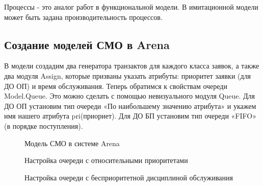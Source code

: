 \documentclass[a4paper,14pt]{report} %
\begin{document}
Процессы - это аналог работ в функциональной модели. В имита­ционной модели может быть задана производительность процессов. 

\subsection{Создание моделей СМО в Arena}
В модели создадим два генератора транзактов для каждого класса заявок, а также два модуля Assign, которые призваны указать атрибуты: приоритет заявки (для ДО ОП) и время обслуживания. Теперь обратимся к свойствам очереди Model.Queue. Это можно сделать с помощью невизуального модуля Queue. Для ДО ОП установим тип очереди «По наибольшему значению атрибута» и укажем имя нашего атрибута pri(приориет). Для ДО БП  установим тип очереди «FIFO» (в порядке поступления).

\begin{figure}[h] %
\caption{Модель СМО в системе Arena}
\label{ris:model_Arena}
\end{figure} %

\begin{figure}[h] %
\caption{Настройка очереди с относительными приоритетами}
\label{ris:queue_pri}
\end{figure} %

\begin{figure}[h] %
\caption{Настройка очереди с бесприоритетной дисциплиной обслуживания}
\label{ris:queue}
\end{figure} %
\end{document}

